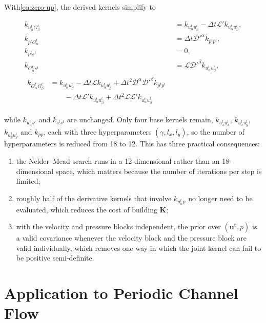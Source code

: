 \documentclass[11pt, a4paper]{report}
\begin{document}
With\eqref{eq:zero-up}, the derived kernels simplify to
 
\begin{align}
k_{u^{t}_\alpha G^{t}_\beta} &= k_{u^{t}_\alpha u^{t}_\beta} - \Delta t \mathcal{L}' k_{u^{t}_\alpha u^{t}_\beta}, \\
k_{p^{t} G^{t}_\alpha} &= \Delta t \mathcal{D}'^\alpha k_{p^{t}p^{t}}, \\
k_{p^{t}s^{t}} &= 0, \\
k_{G^{t}_\alpha s^{t}} &= \mathcal{L} \mathcal{D}'^\beta k_{u^{t}_\alpha u^{t}_\beta}, \\
\begin{split}
k_{G^{t}_\alpha G^{t}_\beta} &= k_{u^{t}_\alpha u^{t}_\beta}
 - \Delta t \mathcal{L} k_{u^{t}_\alpha u^{t}_\beta}
 + \Delta t^2 \mathcal{D}^\alpha \mathcal{D}'^\beta k_{p^{t}p^{t}} \\
&\qquad - \Delta t \mathcal{L}' k_{u^{t}_\alpha u^{t}_\beta}
 + \Delta t^2 \mathcal{L} \mathcal{L}' k_{u^{t}_\alpha u^{t}_\beta}
\end{split}
\end{align}
 
\noindent while \(k_{u^t_\alpha s^t}\) and \(k_{s^t s^t}\) are unchanged. Only four base kernels remain,
\(k_{u^t_x u^t_x}\), \(k_{u^t_x u^t_y}\), \(k_{u^t_y u^t_y}\) and \(k_{pp}\), each with three hyperparameters
\((\gamma, l_x, l_y)\), so the number of hyperparameters is reduced from 18 to 12.
This has three practical consequences:
\begin{enumerate}
    \item the Nelder--Mead search runs in a 12-dimensional rather than an 18-dimensional space,
          which matters because the number of iterations per step is limited;
    \item roughly half of the derivative kernels that involve \(k_{u^t_\alpha p}\) no longer need to be
          evaluated, which reduces the cost of building \(\boldsymbol{K}\);
    \item with the velocity and pressure blocks independent, the prior over \((\boldsymbol{u^t}, p)\) is a
          valid covariance whenever the velocity block and the pressure block are valid individually,
          which removes one way in which the joint kernel can fail to be positive semi-definite.
\end{enumerate}

\section{Application to Periodic Channel Flow}
\label{sec:periodic-channel}
\end{document}
